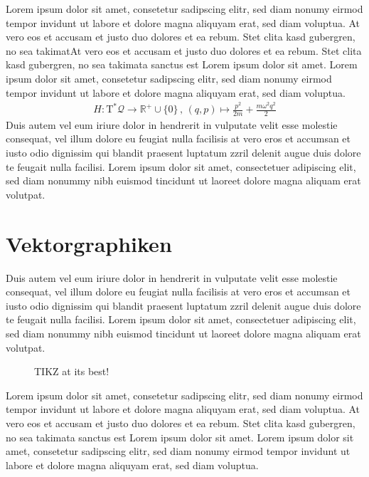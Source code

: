 \documentclass[12pt, a4paper, twoside, headsepline]{scrartcl}
\begin{document}
Lorem ipsum\cite{zfsbsd} dolor sit amet, consetetur sadipscing elitr, sed diam nonumy eirmod tempor invidunt ut labore et dolore magna aliquyam\cite{zfsrel} erat, sed diam voluptua. At vero eos et accusam et justo duo dolores et ea rebum. Stet clita kasd gubergren, no sea takimatAt vero eos et accusam et justo duo dolores et ea rebum. Stet clita kasd gubergren, no sea takimata sanctus est Lorem ipsum dolor sit amet. Lorem ipsum dolor sit amet, consetetur sadipscing elitr, sed diam nonumy eirmod tempor invidunt ut labore et dolore magna aliquyam erat, sed diam voluptua. 
\begin{align}
H: \mathrm T^\ast \mathcal Q \rightarrow  \mathbb R^+ \cup \{0\} \, , \, (q,p) \mapsto \frac{p^2}{2m} + \frac{m \omega^2 q^2}{2}
\end{align}
Duis autem vel eum iriure dolor in hendrerit in vulputate velit esse molestie consequat, vel illum dolore eu feugiat nulla facilisis at vero eros et accumsan et iusto odio dignissim qui blandit praesent luptatum zzril delenit augue duis dolore te feugait nulla facilisi. Lorem ipsum dolor sit amet, consectetuer adipiscing elit, sed diam nonummy nibh euismod tincidunt ut laoreet dolore magna aliquam erat volutpat. 

\section{Vektorgraphiken}

Duis autem vel eum iriure dolor in hendrerit in vulputate velit esse molestie consequat, vel illum dolore eu feugiat nulla facilisis at vero eros et accumsan et iusto odio dignissim qui blandit praesent luptatum zzril delenit augue duis dolore te feugait nulla facilisi. Lorem ipsum dolor sit amet, consectetuer adipiscing elit, sed diam nonummy nibh euismod tincidunt ut laoreet dolore magna aliquam erat volutpat. 
\begin{figure}[h!]
 \centering
 \caption{TIKZ at its best!}
\end{figure}
Lorem ipsum dolor sit amet, consetetur sadipscing elitr, sed diam nonumy eirmod tempor invidunt ut labore et dolore magna aliquyam erat, sed diam voluptua. At vero eos et accusam et justo duo dolores et ea rebum. Stet clita kasd gubergren, no sea takimata sanctus est Lorem ipsum dolor sit amet. Lorem ipsum dolor sit amet, consetetur sadipscing elitr, sed diam nonumy eirmod tempor invidunt ut labore et dolore magna aliquyam erat, sed diam voluptua. 
\end{document}
